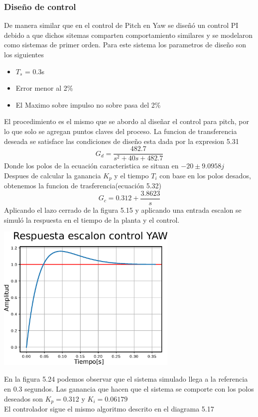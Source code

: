 \subsubsection{Diseño de control}
De manera similar que en el control de Pitch en Yaw se diseñó un control PI debido a que dichos sitemas comparten comportamiento similares y se modelaron como sistemas de primer orden.
Para este sistema los parametros de diseño son los siguientes
\begin{itemize}
	\item $T_s$ = 0.3s
	\item Error menor al 2\%
	\item El Maximo sobre impulso no sobre pasa del 2\%
\end{itemize}
El procedimiento es el mismo que se abordo al diseñar el control para pitch, por lo que solo se agregan puntos claves del proceso.
La funcion de transferencia deseada se satisface las condiciones de diseño esta dada por la expresion 5.31
\begin{equation}
	G_d = \frac{482.7}{s^2 + 40s + 482.7}
\end{equation}
Donde los polos de la ecuación caracteristica se situan en $-20 \pm 9.0958j$\\
Despues de calcular la ganancia $K_p$ y el tiempo $T_i$ con base en los polos desados, obtenemos la funcion de trasferencia(ecuación 5.32) 
\begin{equation}
	G_c = 0.312 + \frac{3.8623}{s}
\end{equation}
Aplicando el lazo cerrado de la figura 5.15 y aplicando una entrada escalon se simuló la respuesta en el tiempo de la planta y el control.
\begin{center}
	\includegraphics[width=0.65\textwidth]{Contenido/Cuerpo/Capitulo5/Fig40.eps}
	\label{Fig4}
\end{center}
En la figura 5.24 podemos observar que el sistema simulado llega a la referencia en 0.3 segundos. Las ganancia que hacen que el sistema se comporte con los polos deseados son 
$K_p = 0.312$ y $K_i = 0.06179$\\
El controlador sigue el mismo algoritmo descrito en el diagrama 5.17

